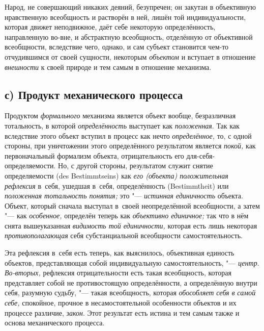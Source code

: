 Народ, не совершающий никаких деяний, безупречен; он закутан
в объективную нравственную всеобщность и растворён в ней, лишён той
индивидуальности, которая движет неподвижное, даёт себе некоторую
определённость, направленную во-вне, и абстрактную всеобщность, отделённую
от объективной всеобщности, вследствие чего, однако, и сам субъект
становится чем-то отчудившимся от своей сущности, некоторым
{\em объектом} и вступает
в отношение {\em внешности}
к своей природе и тем самым в отношение механизма.

\subsection[с) Продукт механического процесса]{с) Продукт механического процесса}

Продуктом
{\em формального}
механизма является объект вообще, безразличная тотальность, в
которой {\em определённость}
выступает как
{\em положенная}. Так как
вследствие этого объект вступил в процесс как нечто
{\em определённое,} то, с
одной стороны, при уничтожении этого определённого результатом является
{\em покой,} как
первоначальный формализм объекта, отрицательность его
для-себя-определяемости. Но, с другой стороны,
результатом служит
снятие
определяемости (des Bestimmt\-seins) как
{\em его (объекта) положительная
рефлексия} в~себя, ушедшая в~себя, определённость
(Bestimmt\-heit) или {\em положенная
тотальность понятия;} это
"--- {\em истинная единичность
}объекта. Объект, который сначала выступал в~своей
неопределённой всеобщности, а затем "--- как
{\em особенное,}
определён теперь как
{\em объективно единичное;}
так что в нём снята вышеуказанная
{\em видимость той единичности,}
которая есть лишь некоторая
{\em противополагающая}
себя субстанциальной всеобщности самостоятельность.

Эта рефлексия в~себя есть теперь, как выяснилось, объективная
единость объектов, представляющая собой индивидуальную самостоятельность,
"--- {\em центр}.
{\em Во-вторых,}
рефлексия отрицательности есть такая всеобщность, которая
представляет собой не противостоящую определённости, а определённую внутри
себя, разумную судьбу, "--- такая всеобщность, которая
{\em обособляет себя в
}{\em самой себе,}
спокойное, прочное в несамостоятельной особенности объектов и
их процессе различие, {\em закон}.
Этот результат есть истина и тем самым также и основа
механического процесса.

